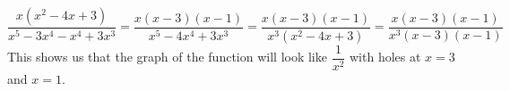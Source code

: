 \documentclass{article}
\begin{document}
\begin{enumerate}
\begin{enumerate}
    \begin{solution}
        $\dfrac{x(x^2-4x+3)}{x^5-3x^4-x^4+3x^3}=\dfrac{x(x-3)(x-1)}{x^5-4x^4+3x^3}=\dfrac{x(x-3)(x-1)}{x^3(x^2-4x+3)}=\dfrac{x(x-3)(x-1)}{x^3(x-3)(x-1)}$\\
        This shows us that the graph of the function will look like $\dfrac{1}{x^2}$ with holes at $x=3$ and $x=1$.
    \end{solution}
  \end{enumerate}

\end{enumerate}
\end{document}
